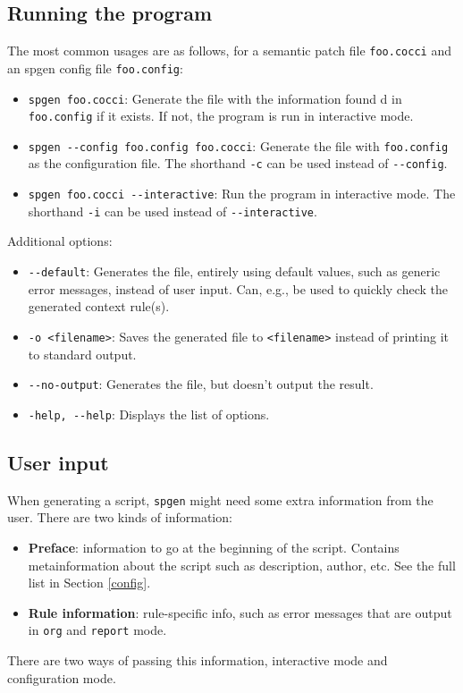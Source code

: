 \subsection{Running the program}
The most common usages are as follows, for a semantic patch file \texttt{foo.cocci} and an spgen config file \texttt{foo.config}:
\begin{itemize}
\item \texttt{spgen foo.cocci}: Generate the file with the information found
d in \texttt{foo.config} if it exists. If not, the program is run in interactive mode.
\item \texttt{spgen -{}-config foo.config foo.cocci}: Generate the file with
  \texttt{foo.config} as the configuration file. The shorthand \texttt{-c} can be used instead of \texttt{-{}-config}.
\item \texttt{spgen foo.cocci -{}-interactive}: Run the program in interactive mode. The shorthand \texttt{-i} can be used instead of \texttt{-{}-interactive}.
\end{itemize}
Additional options:
\begin{itemize}
\item \texttt{-{}-default}: Generates the file, entirely using default values, such as generic error messages, instead of user input. Can, e.g., be used to quickly check the generated context rule(s).
\item \texttt{-o <filename>}: Saves the generated file to \texttt{<filename>} instead of printing it to standard output.
\item \texttt{-{}-no-output}: Generates the file, but doesn't output the result.
\item \texttt{-help, -{}-help}: Displays the list of options.
\end{itemize}
\bigskip

\subsection{User input}
When generating a script, \texttt{spgen} might need some extra information from the user. There are two kinds of information:
\begin{itemize}
\item \textbf{Preface}: information to go at the beginning of the script. Contains metainformation about the script such as description, author, etc. See the full list in Section \ref{config}.
\item \textbf{Rule information}: rule-specific info, such as error messages that are output in \texttt{org} and \texttt{report} mode.
\end{itemize}
There are two ways of passing this information, interactive mode and configuration mode.
\bigskip

